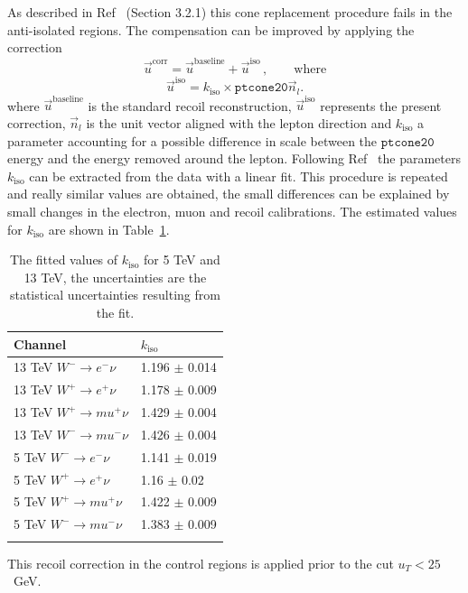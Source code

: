 As described in Ref~\cite{Xu:2657146} (Section 3.2.1) this cone replacement procedure fails in the anti-isolated regions. 
The compensation can be improved by applying the correction
%
\begin{equation}
  \vec{u}^{\mathrm{corr}} = \vec{u}^{\mathrm{baseline}} + \vec{u}^{\mathrm{iso}} \, , \qquad \mathrm{where}
\end{equation}
%
\begin{equation}
  \vec{u}^{\mathrm{iso}} = k_{\mathrm{iso}} \times \texttt{ptcone20} \vec{n}_l.
\end{equation}
%
where $\vec{u}^{\mathrm{baseline}}$ is the standard recoil reconstruction, $\vec{u}^{\mathrm{iso}}$ represents the present correction, $ \vec{n}_l$ is the unit vector aligned with the lepton direction and $k_{\mathrm{iso}}$ a parameter accounting for a possible difference in scale between the $\texttt{ptcone20}$ energy and the energy removed around the lepton.
Following Ref~\cite{Xu:2657146} the parameters $k_{\mathrm{iso}}$ can be extracted from the data with a linear fit.
This procedure is repeated and really similar values are obtained, the small differences can be explained by small changes in the electron, muon and recoil calibrations.
The estimated values for $k_\mathrm{iso}$ are shown in Table~\ref{tab:kiso}.
%
\begin{table}[h!]
  \centering
  \begin{tabular}{ll}
  \hline
  \textbf{Channel} & \textbf{$k_\mathrm{iso}$} \\
  \hline
  13 TeV  $W^- \rightarrow e^- \nu$  & 1.196 $\pm$ 0.014\\
  13 TeV  $W^+ \rightarrow e^+ \nu$  & 1.178 $\pm$ 0.009\\
  13 TeV  $W^+ \rightarrow mu^+ \nu$  & 1.429 $\pm$ 0.004\\
  13 TeV  $W^- \rightarrow mu^- \nu$  & 1.426 $\pm$ 0.004\\
  \hline
  5 TeV  $W^- \rightarrow e^- \nu$  & 1.141 $\pm$ 0.019\\
  5 TeV  $W^+ \rightarrow e^+ \nu$  & 1.16 $\pm$ 0.02\\
  5 TeV  $W^+ \rightarrow mu^+ \nu$  & 1.422 $\pm$ 0.009\\
  5 TeV  $W^- \rightarrow mu^- \nu$  & 1.383 $\pm$ 0.009\\
  \hline
  \vspace{0.3cm}
  \end{tabular}
  \caption{The fitted values of $k_\mathrm{iso}$ for 5 TeV and 13 TeV, the uncertainties are the statistical uncertainties resulting from the fit.}
  \label{tab:kiso}
\end{table}
%
This recoil correction in the control regions is applied prior to the cut $u_T <25$~GeV.



